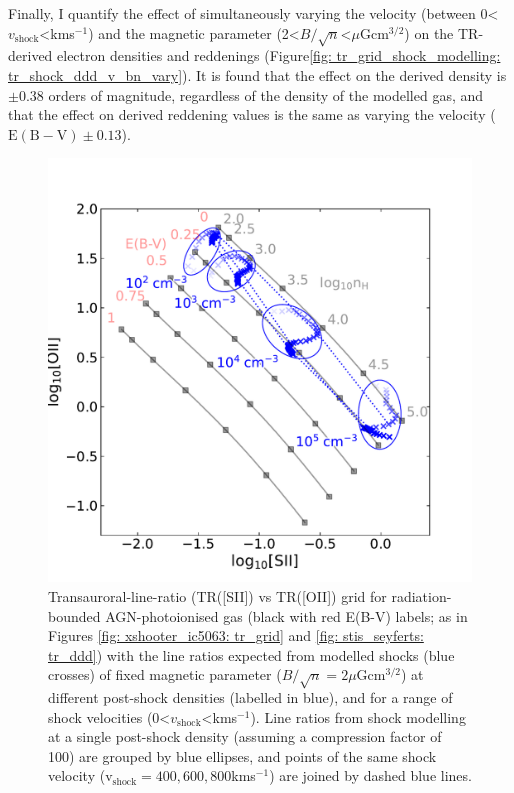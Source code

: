 Finally, I quantify the effect of simultaneously varying the velocity (between 0\;\textless\;$v_\mathrm{shock}$\;\textless{}\;km\;s$^{-1}$) and the magnetic parameter \mbox{(2\;\textless\;$B/\sqrt{n}$\;\textless{}\;$\mu$G\;cm$^{3/2}$)} on the TR-derived electron densities and reddenings (Figure\;\ref{fig: tr_grid_shock_modelling: tr_shock_ddd_v_bn_vary}). It is found that the effect on the derived density is $\pm0.38$ orders of magnitude, regardless of the density of the modelled gas, and that the effect on derived reddening values is the same as varying the velocity ($\mathrm{E(B-V)}\pm0.13$).

\begin{figure}
    \centering
    \includegraphics[width=\linewidth]{figures/tr_grid_shock_modelling/tr_shock_ddd_bn2.pdf}
    \caption[Transauroral-line-ratio grid for shock models at a fixed magnetic parameter and a range of shock velocities.]{Transauroral-line-ratio (TR([SII]) vs TR([OII]) grid for radiation-bounded AGN-photoionised gas (black with red E(B-V) labels; as in Figures \ref{fig: xshooter_ic5063: tr_grid} and  \ref{fig: stis_seyferts: tr_ddd}) with the line ratios expected from modelled shocks (blue crosses) of fixed magnetic parameter ($B/\sqrt{n}=2$\;$\mu$G\;cm$^{3/2}$) at different post-shock densities (labelled in blue), and for a range of shock velocities (0\;\textless\;$v_\mathrm{shock}$\;\textless{}\;km\;s$^{-1}$). Line ratios from shock modelling at a single post-shock density (assuming a compression factor of 100) are grouped by blue ellipses, and points of the same shock velocity (v$_\mathrm{shock}=400,600,800$\;km\;s$^{-1}$) are joined by dashed blue lines.}
    \label{fig: tr_grid_shock_modelling: tr_shock_ddd_v_vary}
\end{figure}

